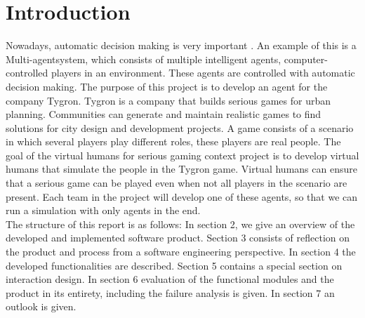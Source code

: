 \chapter{Introduction}
Nowadays, automatic decision making is very important \cite{Lizheng2010}. An example of this is a Multi-agentsystem, which consists of multiple intelligent agents, computer-controlled players in an environment. These agents are controlled with automatic decision making. The purpose of this project is to develop an agent for the company Tygron. Tygron is a company that builds serious games for urban planning. Communities can generate and maintain realistic games to find solutions for city design and development projects. A game consists of a scenario in which several players play different roles, these players are real people. The goal of the virtual humans for serious gaming context project is to develop virtual humans that simulate the people in the Tygron game. Virtual humans can ensure that a serious game can be played even when not all players in the scenario are present. Each team in the project will develop one of these agents, so that we can run a simulation with only agents in the end.\\

The structure of this report is as follows:
In section 2, we give an overview of the developed and implemented software product. Section 3 consists of reflection on the product and process from a software engineering perspective. In section 4 the developed functionalities are described. Section 5 contains a special section on interaction design. In section 6 evaluation of the functional modules and the product in its entirety, including the failure analysis is given. In section 7 an outlook is given.
